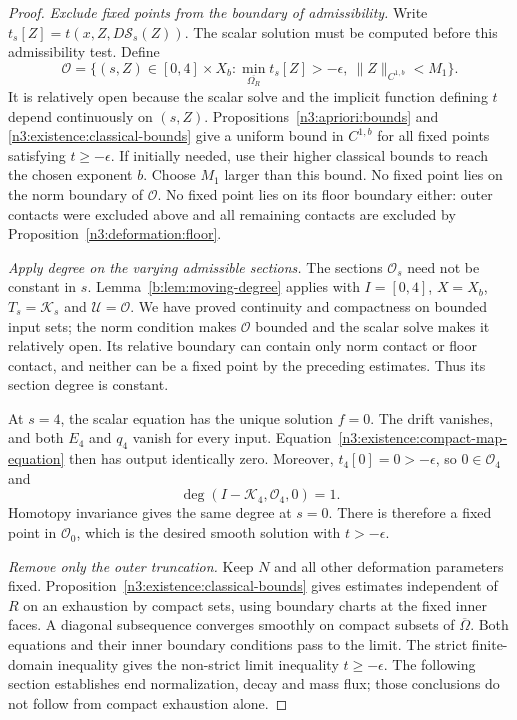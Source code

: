 \begin{proof}
\emph{Exclude fixed points from the boundary of admissibility.}
Write $t_s[Z]=t(x,Z,D\mathcal S_s(Z))$. The scalar solution must
be computed before this admissibility test. Define
\begin{equation}\label{n3:existence:admissible-open-set}
 \mathcal O=\{(s,Z)\in[0,4]\times X_b:
       \min_{\overline{\Omega_R}}t_s[Z]>-\epsilon,
       \ \|Z\|_{C^{1,b}}<M_1\}.
\end{equation}
It is relatively open because the scalar solve and the implicit
function defining $t$ depend continuously on $(s,Z)$.
Propositions~\ref{n3:apriori:bounds} and
\ref{n3:existence:classical-bounds} give a uniform bound in $C^{1,b}$
for all fixed points satisfying $t\ge-\epsilon$.  If initially
needed, use their higher classical bounds to reach the chosen
exponent $b$.  Choose $M_1$ larger than this bound.  No fixed point
lies on the norm boundary of $\mathcal O$.  No fixed point lies on
its floor boundary either: outer contacts were excluded above and
all remaining contacts are excluded by
Proposition~\ref{n3:deformation:floor}.

\emph{Apply degree on the varying admissible sections.}
The sections $\mathcal O_s$ need not be constant in $s$.
Lemma~\ref{b:lem:moving-degree} applies with $I=[0,4]$, $X=X_b$,
$T_s=\mathcal K_s$ and $\mathcal U=\mathcal O$.
We have proved continuity and compactness on bounded input sets;
the norm condition makes $\mathcal O$ bounded and the scalar solve
makes it relatively open. Its relative boundary can contain only
norm contact or floor contact, and neither can be a fixed point by
the preceding estimates. Thus its section degree is constant.

At $s=4$, the scalar equation has the unique solution $f=0$.
The drift vanishes, and both $E_4$ and $q_4$ vanish for every input.
Equation~\eqref{n3:existence:compact-map-equation} then has output
identically zero.  Moreover, $t_4[0]=0>-\epsilon$, so
$0\in\mathcal O_4$ and
\begin{equation}\label{n3:existence:degree-one}
 \deg(I-\mathcal K_4,\mathcal O_4,0)=1.
\end{equation}
Homotopy invariance gives the same degree at $s=0$.  There is
therefore a fixed point in $\mathcal O_0$, which is the desired
smooth solution with $t>-\epsilon$.

\emph{Remove only the outer truncation.}
Keep $N$ and all other deformation parameters fixed.
Proposition~\ref{n3:existence:classical-bounds} gives estimates
independent of $R$ on an exhaustion by compact sets, using boundary
charts at the fixed inner faces. A diagonal subsequence converges
smoothly on compact subsets of $\overline\Omega$.
Both equations and their inner boundary conditions pass to the
limit. The strict finite-domain inequality gives the non-strict
limit inequality $t\ge-\epsilon$. The following section establishes
end normalization, decay and mass flux; those conclusions do not
follow from compact exhaustion alone.
\end{proof}

